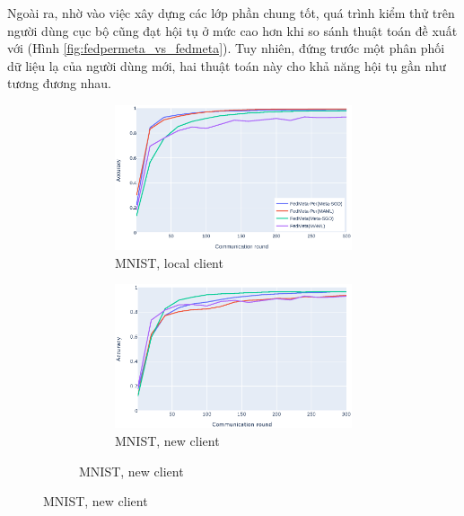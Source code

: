 \documentclass[runningheads]{llncs}
\begin{document}
Ngoài ra, nhờ vào việc xây dựng các lớp phần chung tốt, quá trình kiểm thử trên người dùng cục bộ cũng đạt hội tụ ở mức cao hơn khi so sánh thuật toán đề xuất với  (Hình \ref{fig:fedpermeta_vs_fedmeta}). Tuy nhiên, đứng trước một phân phối dữ liệu lạ của người dùng mới, hai thuật toán này cho khả năng hội tụ gần như tương đương nhau.

\begin{figure}[h]
    \centering
    \begin{subfigure}{\textwidth}
        \centering
        \begin{subfigure}{.49\textwidth}
            \includegraphics[width=\linewidth]{img/mnist_old_metaper.eps}
            \caption{MNIST, local client}\label{mnist_old_metaper}
        \end{subfigure}
        \begin{subfigure}{.49\textwidth}
            \includegraphics[width=\linewidth]{img/mnist_new_metaper.eps}
            \caption{MNIST, new client}\label{mnist_new_metaper}

\end{subfigure}
\end{subfigure}
\end{figure}
\end{document}
